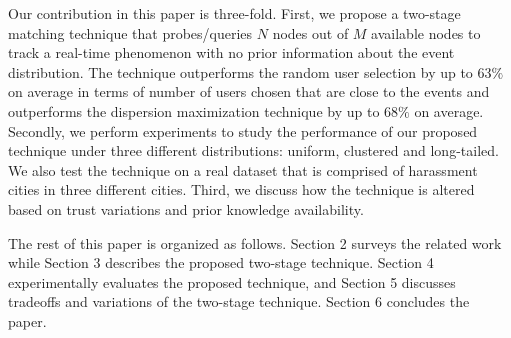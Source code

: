 \documentclass{acm_proc_article-sp}
\begin{document}
Our contribution in this paper is three-fold. First, we propose a two-stage matching technique that probes/queries $N$ nodes out of $M$ available nodes to track a real-time phenomenon with no prior information about the event distribution. The technique outperforms the random user selection by up to $63\%$ on average in terms of number of users chosen that are close to the events and outperforms the dispersion maximization technique by up to $68\%$ on average. Secondly, we perform experiments to study the performance of our proposed technique under three different distributions: uniform, clustered and long-tailed. We also test the technique on a real dataset that is comprised of harassment cities in three different cities. Third, we discuss how the technique is altered based on trust variations and prior knowledge availability.\par

The rest of this paper is organized as follows. Section 2 surveys the related work while Section 3 describes the proposed two-stage technique. Section 4 experimentally evaluates the proposed technique, and Section 5 discusses tradeoffs and variations of the two-stage technique. Section 6 concludes the paper.
\newpage
\end{document}
